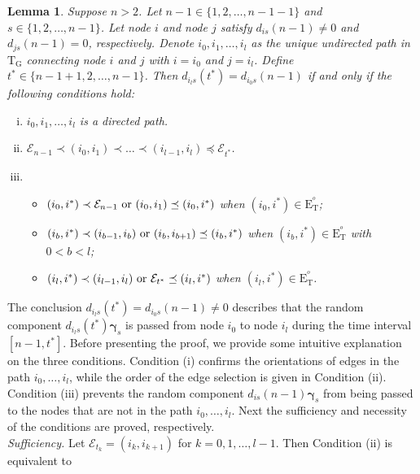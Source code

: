 \documentclass[a4paper, 11pt]{article}
\newcommand{\1}{\mathbf{1}}
\newcommand{\asf}{\mathcal{E}}
\newcommand{\mG}{\mathrm{G}}
\newcommand{\mE}{\mathrm{E}}
\newcommand{\mT}{\mathrm{T}}
\newcommand{\mET}{\mE_{\mT}^{^o}}
\newcommand{\gammab}{{\bm \gamma}}
\newcommand{\tbeg}{n-1 }
\newcommand{\tend}{t^\ast}
\newtheorem{lemma}{Lemma}
\begin{document}
\begin{lemma}\label{lem:RV_transfer}
	Suppose $n>2$. Let $\tbeg\in\{1,2,\dots,n-1 -1\}$ and $s\in\{1,2,\dots,\tbeg\}$. Let node $i$ and node $j$ satisfy $ d _{i s}(\tbeg)\neq 0$ and $ d _{j s}(\tbeg)= 0$, respectively. Denote $i_0,i_1,\dots,i_l$ as the unique undirected path in $\mT_{\mG}$ connecting node $i$ and $j$ with $i=i_0$ and $j=i_l$. Define $\tend\in\{\tbeg+1,2,\dots,n-1 \}$. Then $d_{i_l s}(\tend)= d_{i_0 s}(\tbeg)$ if and only if the following conditions hold:
	\begin{enumerate}[(i)]
		\item $i_0,i_1,\dots,i_l$ is a directed path.
		
		\item $\asf_{\tbeg}\prec(i_0,i_1)\prec\dots\prec(i_{l-1},i_l)\preceq\asf_{\tend}$.
		
		\item \begin{itemize}
			\item[a)] $(i_0,i^\ast)\prec\asf_{\tbeg}\textnormal{ or }(i_0,i_{1})\preceq(i_0,i^\ast)$ when $(i_0,i^\ast)\in\mET$;
			\item[b)] $(i_b,i^\ast)\prec(i_{b-1},i_{b})\textnormal{ or }(i_b,i_{b+1})\preceq(i_b,i^\ast)$ when $(i_b,i^\ast)\in\mET$ with $0<b<l$;
			\item[c)] $(i_l,i^\ast)\prec(i_{l-1},i_{l})\textnormal{ or }\asf_{\tend}\preceq(i_l,i^\ast)$ when $(i_l,i^\ast)\in\mET$.
		\end{itemize}
	\end{enumerate}
\end{lemma}
The conclusion $d_{i_l s}(\tend)= d_{i_0 s}(\tbeg)\neq0$ describes that the random component $d_{i_l s}(\tend)\gammab_{s}$ is passed from node $i_0$ to node $i_l$ during the time interval $[\tbeg,\tend]$. Before presenting the proof, we provide some intuitive explanation on the three conditions. Condition (i) confirms the orientations of edges in the path $i_0,\dots,i_l$, while the order of the edge selection is given in Condition (ii). Condition (iii) prevents the random component $d_{is}(\tbeg)\gammab_s$ from being passed to the nodes that are not in the path $i_0,\dots,i_l$. Next the sufficiency and necessity of the conditions are proved, respectively.\\
\emph{Sufficiency.}
Let $\asf_{t_k}=(i_k,i_{k+1})$ for $k=0,1,\dots,l-1$. Then Condition (ii) is equivalent to
\end{document}
